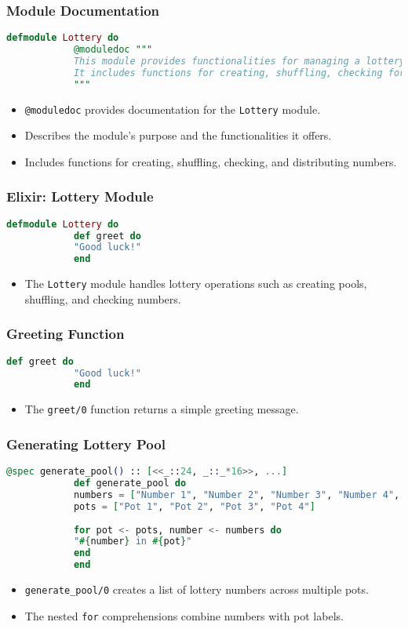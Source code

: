 \documentclass[aspectratio=169, table]{beamer}
\begin{document}
	\begin{frame}[fragile]
		\frametitle{Module Documentation}
		\begin{lstlisting}[language=Elixir]
			defmodule Lottery do
			@moduledoc """
			This module provides functionalities for managing a lottery system.
			It includes functions for creating, shuffling, checking for numbers, and distributing numbers within the lottery pool.
			"""
		\end{lstlisting}
		\begin{itemize}
			\item \texttt{@moduledoc} provides documentation for the \texttt{Lottery} module.
			\item Describes the module's purpose and the functionalities it offers.
			\item Includes functions for creating, shuffling, checking, and distributing numbers.
		\end{itemize}
	\end{frame}
	
	\begin{frame}[fragile]
		\frametitle{Elixir: Lottery Module}
		\begin{lstlisting}[language=Elixir]
			defmodule Lottery do
			def greet do
			"Good luck!"
			end
		\end{lstlisting}
		\begin{itemize}
			\item The \texttt{Lottery} module handles lottery operations such as creating pools, shuffling, and checking numbers.
		\end{itemize}
	\end{frame}
	
	\begin{frame}[fragile]
		\frametitle{Greeting Function}
		\begin{lstlisting}[language=Elixir]
			def greet do
			"Good luck!"
			end
		\end{lstlisting}
		\begin{itemize}
			\item The \texttt{greet/0} function returns a simple greeting message.
		\end{itemize}
	\end{frame}
	
	\begin{frame}[fragile]
		\frametitle{Generating Lottery Pool}
		\begin{lstlisting}[language=Elixir]
			@spec generate_pool() :: [<<_::24, _::_*16>>, ...]
			def generate_pool do
			numbers = ["Number 1", "Number 2", "Number 3", "Number 4", "Number 5", "Number 6"]
			pots = ["Pot 1", "Pot 2", "Pot 3", "Pot 4"]
			
			for pot <- pots, number <- numbers do
			"#{number} in #{pot}"
			end
			end
		\end{lstlisting}
		\begin{itemize}
			\item \texttt{generate\_pool/0} creates a list of lottery numbers across multiple pots.
			\item The nested \texttt{for} comprehensions combine numbers with pot labels.
		\end{itemize}
	\end{frame}
	
\end{document}
